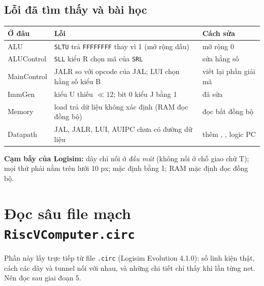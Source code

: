 \documentclass[11pt,a4paper]{article}
\newcommand{\sig}[1]{\texttt{\detokenize{#1}}}
\begin{document}
\subsection{Lỗi đã tìm thấy và bài học}
\begin{center}
\small
\begin{tabular}{@{}lp{5.2cm}p{4.5cm}@{}}
\toprule
\textbf{Ở đâu} & \textbf{Lỗi} & \textbf{Cách sửa}\\
\midrule
ALU & \texttt{SLTU} trả \texttt{FFFFFFFF} thay vì 1 (mở rộng dấu) & mở rộng 0\\
ALUControl & \texttt{SLL} kiểu R chọn mã của \texttt{SRL} & sửa hằng số\\
MainControl & JALR so với opcode của JAL; LUI chọn hằng số kiểu B & viết lại phần giải mã\\
ImmGen & kiểu U thiếu $\ll12$; bit 0 kiểu J bằng 1 & đã sửa\\
Memory & load trả dữ liệu không xác định (RAM đọc đồng bộ) & đọc bất đồng bộ\\
Datapath & JAL, JALR, LUI, AUIPC chưa có đường dữ liệu & thêm \sig{ASel}, \sig{WBSel}, logic PC\\
\bottomrule
\end{tabular}
\end{center}
\textbf{Cạm bẫy của Logisim:} dây chỉ nối ở \emph{đầu mút} (không nối ở chỗ giao chữ T); mọi thứ phải nằm trên lưới 10 px; \sig{Constant} mặc định bằng 1; RAM mặc định đọc đồng bộ.

\section{Đọc sâu file mạch \texttt{RiscVComputer.circ}}
\label{sec:circ}
Phần này lấy trực tiếp từ file \texttt{.circ} (Logisim Evolution 4.1.0): số linh kiện thật, cách các dây và tunnel nối với nhau, và những chi tiết chỉ thấy khi lần từng net. Nên đọc sau giai đoạn 5.
\end{document}
